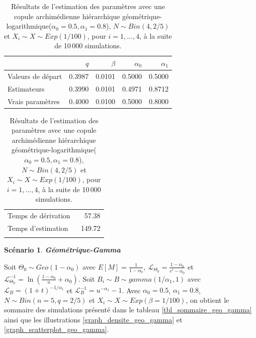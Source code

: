 \documentclass{article}
\newtheorem{Scenario}{Scénario}
\begin{document}
	\begin{table}[H]
		\centering
		\begin{tabular}{lrrrr}
			\hline
			& $q$ & $\beta$ & $\alpha_0$ & $\alpha_1$ \\ 
			\hline
			Valeurs de départ & 0.3987 & 0.0101 & 0.5000 & 0.5000 \\ 
			Estimateurs & 0.3990 & 0.0101 & 0.4971 & 0.8712 \\ 
			Vrais paramètres & 0.4000 & 0.0100 & 0.5000 & 0.8000 \\
			\hline
		\end{tabular}
		\begin{tabular}{lr}
			\hline
			&  \\ 
			\hline
			Temps de dérivation & 57.38 \\ 
			Temps d'estimation & 149.72 \\
			\\
			\hline
		\end{tabular}
		\caption[Résultats du scénario \ref{scenario_geo_log}]{Résultats de l'estimation des paramètres avec une copule archimédienne hiérarchique géométrique-logarithmique($\alpha_0=0.5, \alpha_1 = 0.8$), $N \sim Bin(4, 2/5)$ et $X_i \sim X \sim Exp(1/100)$, pour $i=1,\dots,4$, à la suite de 10\,000 simulations.}
		\label{tbl_resultats_geo_log}
	\end{table}



	\begin{Scenario}\label{scenario_geo_gamma}
		\textbf{Géométrique-Gamma}
	\end{Scenario}
	
	Soit $\Theta_0 \sim Geo(1-\alpha_0)$ avec $E[M] = \frac{1}{1-\alpha_0},\ \mathscr{L}_{\Theta_0} = \frac{1-\alpha_0}{e^t-\alpha_0}$ et $\mathscr{L}^{-1}_{\Theta_0} = \ln\left(\frac{1 - \alpha_0}{u}+\alpha_0\right)$.
	Soit $B_i \sim B \sim gamma(1/\alpha_1,1)$ avec $\mathscr{L}_{B} = (1+t)^{-1/\alpha_1}$ et $\mathscr{L}^{-1}_{B} = u^{-\alpha_1} - 1$. Avec $\alpha_0 = 0.5$, $\alpha_1 = 0.8$, $N\sim Bin(n=5, q=2/5)$ et $X_i \sim X \sim Exp(\beta = 1/100)$, on obtient le sommaire des simulations présenté dans le tableau \ref{tbl_sommaire_geo_gamma} ainsi que les illustrations \ref{graph_densite_geo_gamma} et \ref{graph_scatterplot_geo_gamma}.
	
\end{document}
